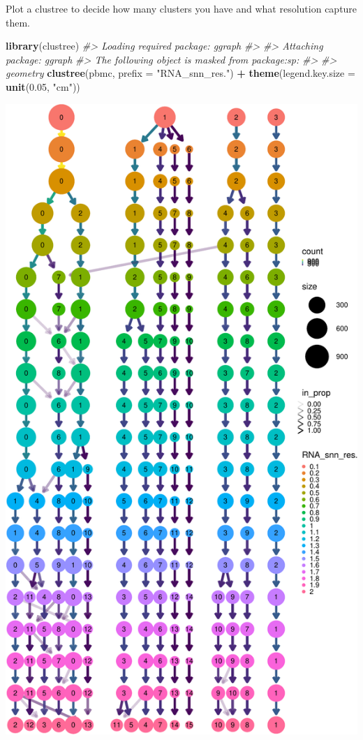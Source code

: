 \documentclass[
]{book}
\newenvironment{Shaded}{\begin{snugshade}}{\end{snugshade}}
\newcommand{\AttributeTok}[1]{\textcolor[rgb]{0.13,0.29,0.53}{#1}}
\newcommand{\CommentTok}[1]{\textcolor[rgb]{0.56,0.35,0.01}{\textit{#1}}}
\newcommand{\FloatTok}[1]{\textcolor[rgb]{0.00,0.00,0.81}{#1}}
\newcommand{\FunctionTok}[1]{\textcolor[rgb]{0.13,0.29,0.53}{\textbf{#1}}}
\newcommand{\NormalTok}[1]{#1}
\newcommand{\SpecialCharTok}[1]{\textcolor[rgb]{0.81,0.36,0.00}{\textbf{#1}}}
\newcommand{\StringTok}[1]{\textcolor[rgb]{0.31,0.60,0.02}{#1}}
\begin{document}
Plot a clustree to decide how many clusters you have and what resolution capture them.

\begin{Shaded}
\begin{Highlighting}[]
\FunctionTok{library}\NormalTok{(clustree)}
\CommentTok{\#\textgreater{} Loading required package: ggraph}
\CommentTok{\#\textgreater{} }
\CommentTok{\#\textgreater{} Attaching package: \textquotesingle{}ggraph\textquotesingle{}}
\CommentTok{\#\textgreater{} The following object is masked from \textquotesingle{}package:sp\textquotesingle{}:}
\CommentTok{\#\textgreater{} }
\CommentTok{\#\textgreater{}     geometry}
\FunctionTok{clustree}\NormalTok{(pbmc, }\AttributeTok{prefix =} \StringTok{"RNA\_snn\_res."}\NormalTok{) }\SpecialCharTok{+} \FunctionTok{theme}\NormalTok{(}\AttributeTok{legend.key.size =} \FunctionTok{unit}\NormalTok{(}\FloatTok{0.05}\NormalTok{, }\StringTok{"cm"}\NormalTok{))}
\end{Highlighting}
\end{Shaded}

\includegraphics{scRNAseqInR_Doco_files/figure-latex/unnamed-chunk-25-1.pdf}
\end{document}
